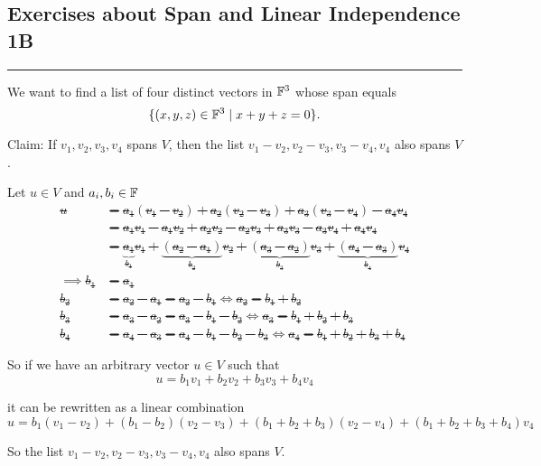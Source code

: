 \subsection*{Exercises about Span and Linear Independence 1B}
\hrule
\phantom{.}

\begin{xrcs}
  We want to find a list of four distinct vectors in $\mathbb{F}^3$ whose span equals
  \begin{equation}
    \{(x,y,z) \in \mathbb{F}^3 \mid x + y + z = 0 \}.
  \end{equation}
\end{xrcs}

\begin{xrcs}
  Claim: If $v_1, v_2, v_3, v_4$ spans $V$, then the list $v_1 - v_2, v_2 -v_3, v_3 -v_4, v_4$ also spans $V$.

  \begin{xprf}
    Let $u \in V$ and $a_i, b_i \in \mathbb{F}$ \st
    \[
    \begin{aligned}
      u
      &= a_1 (v_1 -v_2) + a_2 (v_2-v_3) + a_3 (v_3-v_4)-a_4 v_4 \\
      &= a_1 v_1 - a_1 v_2 + a_2v_2 - a_2 v_3 + a_3 v_3 - a_3 v_4 + a_4 v_4 \\
      &= \underbrace{a_1}_{b_1} v_1 + \underbrace{(a_2 -a_1)}_{b_2} v_2 + \underbrace{(a_3 -a_2)}_{b_3} v_3 + \underbrace{(a_4 -a_3)}_{b_4} v_4 \\
      \implies b_1 & = a_1 \\
      b_2 &= a_2 -a_1 = a_2 - b_1 \iff a_2 = b_1 + b_2 \\
      b_3 &= a_3 - a_2 = a_3 - b_1 -b_2 \iff a_3 = b_1 + b_2 + b_3 \\
      b_4 &= a_4 - a_3 = a_4 - b_1 - b_2 - b_3 \iff a_4 = b_1 + b_2 + b_3 + b_4
    \end{aligned}
    \]

    So if we have an arbitrary vector $u \in V$ such that
    \[
    u = b_1 v_1 +  b_2 v_2 + b_3 v_3 + b_4 v_4
    \]

    it can be rewritten as a linear combination
    \[
    u = b_1 (v_1 - v_2) + (b_1-b_2)(v_2-v_3) + (b_1+b_2+b_3)(v_2-v_4)+(b_1+b_2+b_3+b_4)v_4
    \]

    So the list $v_1 - v_2, v_2 -v_3, v_3 -v_4, v_4$ also spans $V$.
  \end{xprf}
\end{xrcs}


